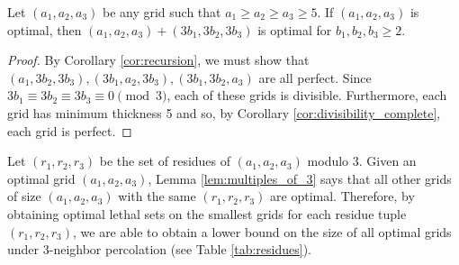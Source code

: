 
\begin{lem}
\label{lem:multiples_of_3}
Let $(a_1,a_2,a_3)$ be any grid such that $a_1 \geq a_2 \geq a_3 \geq 5$. If $(a_1,a_2,a_3)$ is optimal, then $(a_1,a_2,a_3) + (3b_1,3b_2,3b_3)$ is optimal for $b_1,b_2,b_3 \geq 2$. 
\end{lem}

\begin{proof}
By Corollary \ref{cor:recursion}, we must show that $(a_1,3b_2,3b_3), (3b_1,a_2,3b_3), (3b_1,3b_2,a_3)$ are all perfect. Since $3b_1 \equiv 3b_2 \equiv 3b_3 \equiv 0 \pmod 3$, each of these grids is divisible. Furthermore, each grid has minimum thickness 5 and so, by Corollary \ref{cor:divisibility_complete}, each grid is perfect.
\end{proof}

Let $(r_1,r_2,r_3)$ be the set of residues of $(a_1,a_2,a_3)$ modulo 3. Given an optimal grid $(a_1,a_2,a_3)$, Lemma \ref{lem:multiples_of_3} says that all other grids of size $(a_1,a_2,a_3)$ with the same $(r_1,r_2,r_3)$ are optimal. Therefore, by obtaining optimal lethal sets on the smallest grids for each residue tuple $(r_1,r_2,r_3)$, we are able to obtain a lower bound on the size of all optimal grids under 3-neighbor percolation (see Table \ref{tab:residues}).



